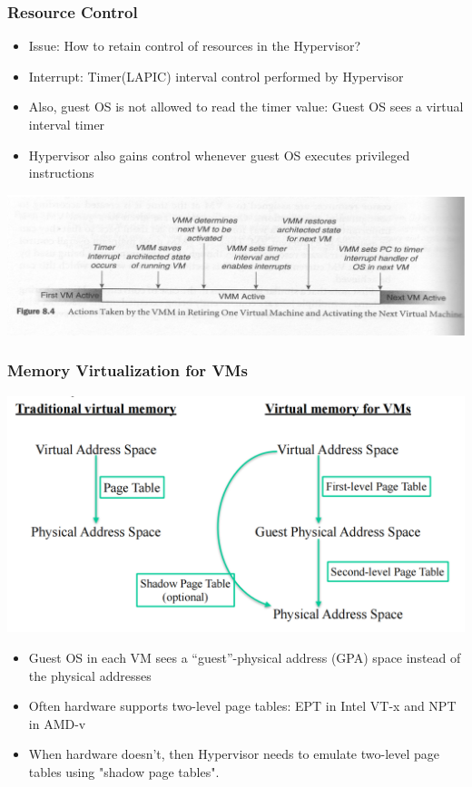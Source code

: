\documentclass[12pt]{article}
\begin{document}
\subsubsection{Resource Control}
\begin{itemize}
    \item Issue: How to retain control of resources in the Hypervisor?
    \item Interrupt: Timer(LAPIC) interval control performed by Hypervisor
    \item Also, guest OS is not allowed to read the timer value: Guest OS sees a virtual interval timer
    \item Hypervisor also gains control whenever guest OS executes privileged instructions
\end{itemize}
\includegraphics[width=\textwidth]{ResourceControl.png}
\subsubsection{Memory Virtualization for VMs}
\includegraphics[width=\textwidth]{MemoryVirtualizationforVMs.png}
\begin{itemize}
    \item Guest OS in each VM sees a “guest”-physical address (GPA) space instead of the physical addresses
    \item Often hardware supports two-level page tables: EPT in Intel VT-x and NPT in AMD-v
    \item When hardware doesn't, then Hypervisor needs to emulate two-level page tables using "shadow page tables".
\end{itemize}
\end{document}
